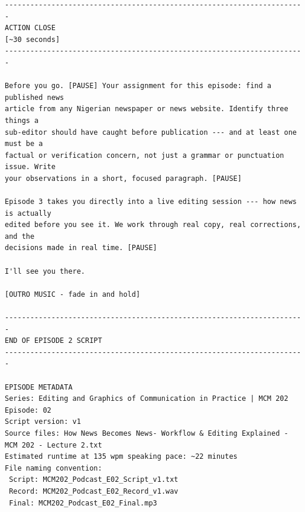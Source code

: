 {\begin{Verbatim}
-----------------------------------------------------------------------
ACTION CLOSE
[~30 seconds]
-----------------------------------------------------------------------

Before you go. [PAUSE] Your assignment for this episode: find a published news
article from any Nigerian newspaper or news website. Identify three things a
sub-editor should have caught before publication --- and at least one must be a
factual or verification concern, not just a grammar or punctuation issue. Write
your observations in a short, focused paragraph. [PAUSE]

Episode 3 takes you directly into a live editing session --- how news is actually
edited before you see it. We work through real copy, real corrections, and the
decisions made in real time. [PAUSE]

I'll see you there.

[OUTRO MUSIC - fade in and hold]

-----------------------------------------------------------------------
END OF EPISODE 2 SCRIPT
-----------------------------------------------------------------------

EPISODE METADATA
Series: Editing and Graphics of Communication in Practice | MCM 202
Episode: 02
Script version: v1
Source files: How News Becomes News- Workflow & Editing Explained - MCM 202 - Lecture 2.txt
Estimated runtime at 135 wpm speaking pace: ~22 minutes
File naming convention:
 Script: MCM202_Podcast_E02_Script_v1.txt
 Record: MCM202_Podcast_E02_Record_v1.wav
 Final: MCM202_Podcast_E02_Final.mp3
\end{Verbatim}
}
